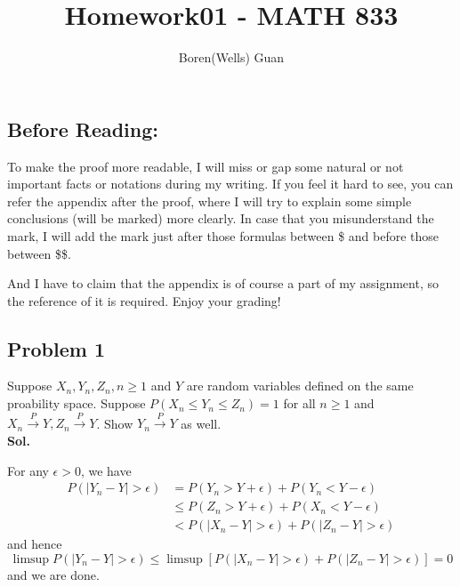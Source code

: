 \documentclass[lang=en,11pt,a4paper,citestyle =authoryear]{elegantpaper}
\title{Homework01 - MATH 833}
\author{Boren(Wells) Guan}
\begin{document}
\maketitle

\subsection*{Before Reading:}\par
To make the proof more readable, I will miss or gap some natural or not important facts or notations during my writing. If you feel it hard to see, you can refer the appendix after the proof, where I will try to explain some simple conclusions (will be marked) more clearly. In case that you misunderstand the mark, I will add the mark just after those formulas between \$ and before those between \$\$.\par
And I have to claim that the appendix is of course a part of my assignment, so the reference of it is required. Enjoy your grading!

\subsection*{Problem 1} 
Suppose $X_n,Y_n,Z_n, n\geq 1$ and $Y$ are random variables defined on the same proability space. Suppose $P(X_n\leq Y_n\leq Z_n) = 1$ for all $n\geq 1$ and $X_n\overset{P}{\to} Y,Z_n\overset{P}{\to} Y$. Show $Y_n\overset{P}{\to} Y$ as well.
\vspace{0.5em}\\
\textbf{Sol.} \par
For any $\epsilon > 0$, we have
\[
\begin{aligned}
    P(|Y_n - Y| > \epsilon) &= P(Y_n > Y+\epsilon) + P(Y_n < Y-\epsilon) \\&\leq P(Z_n > Y+\epsilon) + P(X_n < Y-\epsilon)\\  &< P(|X_n-Y| > \epsilon) + P(|Z_n-Y| > \epsilon)
\end{aligned}
\]
and hence
\[
\limsup P(|Y_n - Y| > \epsilon)  \leq \limsup \left[P(|X_n-Y| > \epsilon) + P(|Z_n-Y| > \epsilon)\right] = 0
\]
and we are done.
\par 
\vspace{0.5em}
\end{document}
